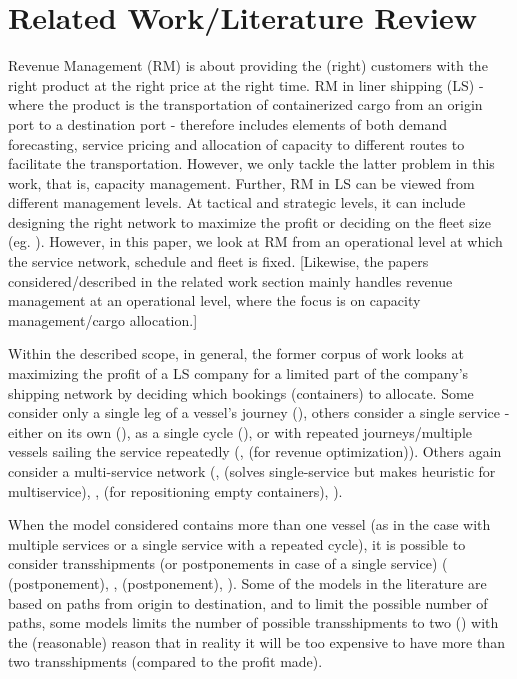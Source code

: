 \section{Related Work/Literature Review}
Revenue Management (RM) is about providing the (right) customers with the right product at the right price at the right time. RM in liner shipping (LS) - where the product is the transportation of containerized cargo from an origin port to a destination port - therefore includes elements of both demand forecasting, service pricing and allocation of capacity to different routes to facilitate the transportation. However, we only tackle the latter problem in this work, that is, capacity management. Further, RM in LS can be viewed from different management levels. At tactical and strategic levels, it can include designing the right network to maximize the profit or deciding on the fleet size (eg. \citet{Ting04,Song12}). However, in this paper, we look at RM from an operational level at which the service network, schedule and fleet is fixed. [Likewise, the papers considered/described in the related work section mainly handles revenue management at an operational level, where the focus is on capacity management/cargo allocation.]

Within the described scope, in general, the former corpus of work looks at maximizing the profit of a LS company for a limited part of the company’s shipping network by deciding which bookings (containers) to allocate. Some consider only a single leg of a vessel’s journey (\citet{Lee07,Bingzhou08}), others consider a single service - either on its own (\citet{Maragos94,Ting04}), as a single cycle (\citet{Feng08,Feng07,Wang19a}), or with repeated journeys/multiple vessels sailing the service repeatedly (\citet{Zou08,Lu10}, \citet{Chang15} (for revenue optimization)). Others again consider a multi-service network (\citet{Zurheide15}, \citet{Demirag07} (solves single-service but makes heuristic for multiservice), \citet{Xianzhi07, Zurheide12, Wang15b}, \citet{Chang15} (for repositioning empty containers), \citet{Song12}).

When the model considered contains more than one vessel (as in the case with multiple services or a single service with a repeated cycle), it is possible to consider transshipments (or postponements in case of a single service) (\citet{Lee07} (postponement), \citet{Zurheide15, Zhen17}, \citet{Wang19b} (postponement), \citet{Xianzhi07, Zurheide12, Wang15b, Song12}). Some of the models in the literature are based on paths from origin to destination, and to limit the possible number of paths, some models limits the number of possible transshipments to two (\citet{Zurheide12, Zurheide15, Song12}) with the (reasonable) reason that in reality it will be too expensive to have more than two transshipments (compared to the profit made).

